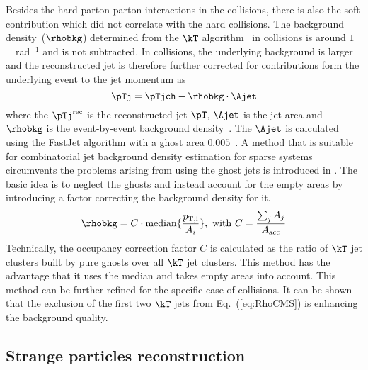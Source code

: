 \documentclass[ALICE,manyauthors]{cernphprep}
\begin{document}
Besides the hard parton-parton interactions in the collisions, there is also the soft contribution which did not correlate with the hard collisions.
The background density~($\rhobkg$) determined from the $\kT$ algorithm~\cite{Catani:1993hr, Ellis:1993tq} in \pp collisions is around $1$~\GeVc~rad$^{-1}$ and is not subtracted.
In \pPb collisions, the underlying background is larger and the reconstructed jet is therefore further corrected for contributions form the underlying event to the jet momentum as
\begin{equation}
\pTj = \pTjch - \rhobkg\cdot\Ajet
\label{eq:DeltaPt}
\end{equation}
where the $\pTj^{\rm rec}$ is the reconstructed jet $\pT$, $\Ajet$ is the jet area and $\rhobkg$ is the event-by-event background density~\cite{Cacciari:2007fd}.
The $\Ajet$ is calculated using the FastJet algorithm with a ghost area $0.005$~\cite{Cacciari:2008gn}.
A method that is suitable for combinatorial jet background density estimation for sparse systems circumvents the problems arising from using the ghost jets is introduced in \cite{Chatrchyan:2012tt}.
The basic idea is to neglect the ghosts and instead account for the empty areas by introducing a factor correcting the background density for it.
\begin{equation}
\rhobkg = C\cdot{\rm median}\{\frac{p_{\rm T,i}}{A_{i}}\},~{\rm with}~C = \frac{\sum_{j} A_{j}}{A_\mathrm{acc}}
\label{eq:RhoCMS}
\end{equation}
Technically, the occupancy correction factor $C$ is calculated as the ratio of $\kT$ jet clusters built by pure ghosts over all $\kT$ jet clusters.
This method has the advantage that it uses the median and takes empty areas into account.
This method can be further refined for the specific case of \pPb collisions.
It can be shown that the exclusion of the first two $\kT$ jets from Eq.~(\ref{eq:RhoCMS}) is enhancing the background quality.

\subsection{Strange particles reconstruction}%
\label{sec:ParRec}
\end{document}
